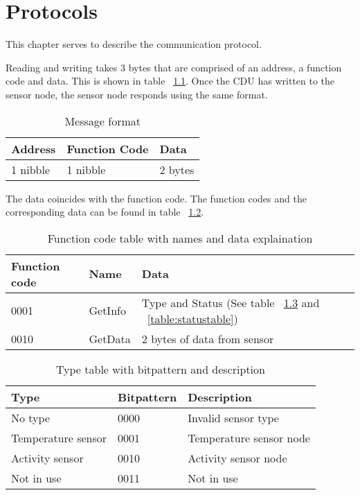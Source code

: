 \chapter{Protocols}
This chapter serves to describe the communication protocol.

Reading and writing takes 3 bytes that are comprised of an address, a function code and data. This is shown in table ~\ref{table:stdmsg}. Once the CDU has written to the sensor node, the sensor node responds using the same format. \\
\begin{table}[H]
\centering
\begin{tabular}{|l|l|l|}
	\hline
	Address & Function Code & Data \\ \hline
	1 nibble & 1 nibble	& 2 bytes \\
	\hline
\end{tabular}
\caption{Message format}
\label{table:stdmsg}
\end{table}
The data coincides with the function code. The function codes and the corresponding data can be found in table ~\ref{table:functioncodes}.

\begin{table}[H]
\centering
\begin{tabular}{|l|l|l|}
	\hline
	Function code & Name & Data \\ 
	\hline
	0001 	& GetInfo & Type and Status (See table ~\ref{table:typetable} and ~\ref{table:statustable}) \\
	\hline
	0010	& GetData & 2 bytes of data from sensor \\
	\hline
\end{tabular}
\caption{Function code table with names and data explaination}
\label{table:functioncodes}
\end{table}


\begin{table}[H]
\centering
\begin{tabular}{|l|l|l|}
	\hline
	Type & Bitpattern & Description \\ 
	\hline
	No type 	& 0000 & Invalid sensor type \\
	\hline
	Temperature sensor & 0001 & Temperature sensor node \\
	\hline
	Activity sensor & 0010 & Activity sensor node \\
	\hline
	Not in use & 0011 & Not in use \\
	\hline
\end{tabular}
\caption{Type table with bitpattern and description}
\label{table:typetable}
\end{table}


